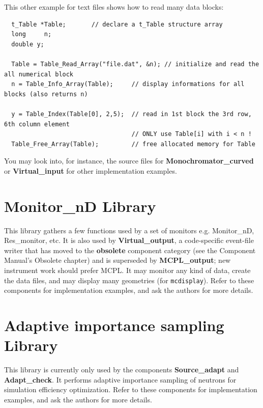 This other example for text files shows how to read many data blocks:
\begin{lstlisting}
  t_Table *Table;       // declare a t_Table structure array
  long     n;
  double y;

  Table = Table_Read_Array("file.dat", &n); // initialize and read the all numerical block
  n = Table_Info_Array(Table);     // display informations for all blocks (also returns n)

  y = Table_Index(Table[0], 2,5);  // read in 1st block the 3rd row, 6th column element
                                   // ONLY use Table[i] with i < n !
  Table_Free_Array(Table);         // free allocated memory for Table
\end{lstlisting}

You may look into, for instance, the source files for
\textbf{Monochromator\_curved} or \textbf{Virtual\_input}
for other implementation examples.

\section{Monitor\_nD Library}

This library gathers a few functions used by a set of monitors e.g. Monitor\_nD, Res\_monitor, etc. It is also used by \textbf{Virtual\_output}, a code-specific event-file writer that has moved to the \textbf{obsolete} component category (see the Component Manual's Obsolete chapter) and is superseded by \textbf{MCPL\_output}; new instrument work should prefer MCPL.
It may monitor any kind of data, create the data files, and may display many geometries (for \verb+mcdisplay+).
Refer to these components for implementation examples, and ask the authors for more details.

\section{Adaptive importance sampling Library}

This library is currently only used by the components \textbf{Source\_adapt}
and \textbf{Adapt\_check}. It performs adaptive importance sampling of neutrons for simulation efficiency optimization.
Refer to these components for implementation examples, and ask the authors for more details.


